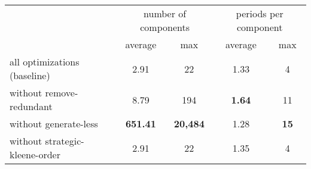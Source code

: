 \begin{table}[H]
	\centering
	\begin{tabular}{l c c c c}
		\toprule
		& \multicolumn{2}{c}{number of components} & \multicolumn{2}{c}{periods per component} \\
		\cmidrule(lr){2-3} \cmidrule(lr){4-5}
		& average & max & average & max \\
		\midrule
	all optimizations (baseline) & 2.91 & 22 & 1.33 & 4 \\
	without remove-redundant & 8.79 & 194 & \textbf{1.64} & 11 \\
	without generate-less & \textbf{651.41} & \textbf{20{,}484} & 1.28 & \textbf{15} \\
	without strategic-kleene-order & 2.91 & 22 & 1.35 & 4 \\
  \bottomrule
	\end{tabular}
\end{table}
